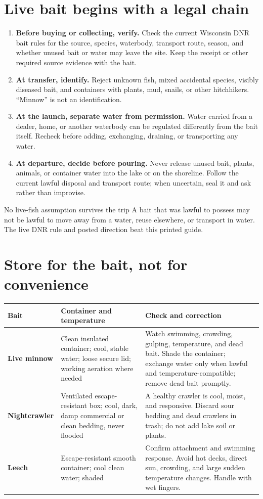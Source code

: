 \newpage
\section{Live bait begins with a legal chain}

\begin{enumerate}
\item \textbf{Before buying or collecting, verify.} Check the current Wisconsin
DNR bait rules for the source, species, waterbody, transport route, season, and
whether unused bait or water may leave the site. Keep the receipt or other
required source evidence with the bait.
\item \textbf{At transfer, identify.} Reject unknown fish, mixed accidental
species, visibly diseased bait, and containers with plants, mud, snails, or
other hitchhikers. ``Minnow'' is not an identification.
\item \textbf{At the launch, separate water from permission.} Water carried
from a dealer, home, or another waterbody can be regulated differently from
the bait itself. Recheck before adding, exchanging, draining, or transporting
any water.
\item \textbf{At departure, decide before pouring.} Never release unused bait,
plants, animals, or container water into the lake or on the shoreline. Follow
the current lawful disposal and transport route; when uncertain, seal it and
ask rather than improvise.
\end{enumerate}

\begin{teloshazard}{No live-fish assumption survives the trip}
A bait that was lawful to possess may not be lawful to move away from a water,
reuse elsewhere, or transport in water. The live DNR rule and posted direction
beat this printed guide.
\end{teloshazard}

\section{Store for the bait, not for convenience}
\begin{tabularx}{\linewidth}{@{}>{\bfseries}p{.18\linewidth}p{.27\linewidth}X@{}}
\toprule
Bait & Container and temperature & Check and correction\\
\midrule
Live minnow & Clean insulated container; cool, stable water; loose secure lid;
working aeration where needed & Watch swimming, crowding, gulping, temperature,
and dead bait. Shade the container; exchange water only when lawful and
temperature-compatible; remove dead bait promptly.\\
Nightcrawler & Ventilated escape-resistant box; cool, dark, damp commercial or
clean bedding, never flooded & A healthy crawler is cool, moist, and responsive.
Discard sour bedding and dead crawlers in trash; do not add lake soil or plants.\\
Leech & Escape-resistant smooth container; cool clean water; shaded & Confirm
attachment and swimming response. Avoid hot decks, direct sun, crowding, and
large sudden temperature changes. Handle with wet fingers.\\
\bottomrule
\end{tabularx}

